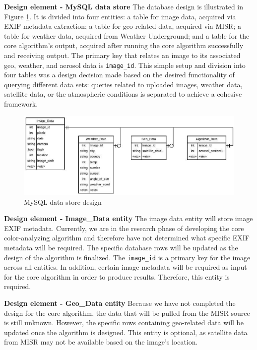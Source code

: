 \documentclass[onecolumn, draftclsnofoot,10pt, compsoc]{IEEEtran}
\begin{document}
\begin{flushleft}
\textbf{Design element - MySQL data store} The database design is illustrated in Figure \ref{fig:mysql}. It is divided into four entities: a table for image data, acquired via EXIF metadata extraction; a table for geo-related data, acquired via MISR; a table for weather data, acquired from Weather Underground; and a table for the core algorithm’s output, acquired after running the core algorithm successfully and receiving output. The primary key that relates an image to its associated geo, weather, and aerosol data is \texttt{image\_id}. This simple setup and division into four tables was a design decision made based on the desired functionality of querying different data sets: queries related to uploaded images, weather data, satellite data, or the atmospheric conditions is separated to achieve a cohesive framework.


\begin{figure}[H]
\centering
  \includegraphics[width=\textwidth]{mysql.eps}
  \caption{MySQL data store design}
  \label{fig:mysql}
\end{figure}


\textbf{Design element - Image\_Data entity} The image data entity will store image EXIF metadata. Currently, we are in the research phase of developing the core color-analyzing algorithm and therefore have not determined what specific EXIF metadata will be required. The specific database rows will be updated as the design of the algorithm is finalized. The \texttt{image\_id} is a primary key for the image across all entities. In addition, certain image metadata will be required as input for the core algorithm in order to produce results. Therefore, this entity is required.

\medskip

\textbf{Design element - Geo\_Data entity} Because we have not completed the design for the core algorithm, the data that will be pulled from the MISR source is still unknown. However, the specific rows containing geo-related data will be updated once the algorithm is designed. This entity is optional, as satellite data from MISR may not be available based on the image’s location. 


\end{flushleft}
\end{document}
